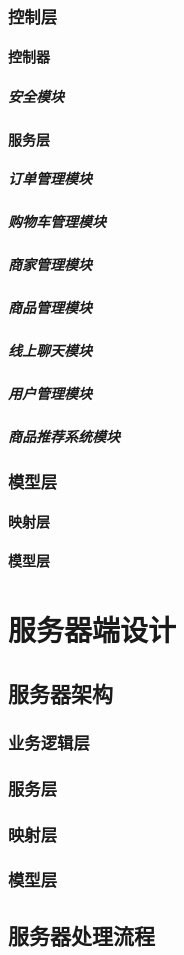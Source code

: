 \documentclass[12pt]{ctexart} %
\begin{document}
\subsubsection{控制层}
\paragraph{控制器}
\subparagraph{安全模块}
\paragraph{服务层}
\subparagraph{订单管理模块}
\subparagraph{购物车管理模块}
\subparagraph{商家管理模块}
\subparagraph{商品管理模块}
\subparagraph{线上聊天模块}
\subparagraph{用户管理模块}
\subparagraph{商品推荐系统模块}
\subsubsection{模型层}
\paragraph{映射层}
\paragraph{模型层}

\section{服务器端设计}

\subsection{服务器架构}
\subsubsection{业务逻辑层}
\subsubsection{服务层}
\subsubsection{映射层}
\subsubsection{模型层}
\subsection{服务器处理流程}
\end{document}
